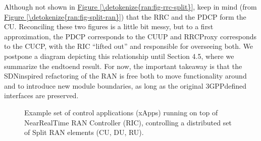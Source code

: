 \documentclass[a4paper,11pt,english]{sphinxmanual}
\let\sphinxpxdimen\pdfpxdimen\else\newdimen\sphinxpxdimen
\begin{document}
\sphinxAtStartPar
Although not shown in \hyperref[\detokenize{ran:fig-rrc-split}]{Figure \ref{\detokenize{ran:fig-rrc-split}}}, keep in
mind (from \hyperref[\detokenize{ran:fig-split-ran}]{Figure \ref{\detokenize{ran:fig-split-ran}}}) that the RRC and the
PDCP form the CU. Reconciling these two figures is a little bit messy, but
to a first approximation, the PDCP corresponds to the CU\sphinxhyphen{}UP and
RRC\sphinxhyphen{}Proxy corresponds to the CU\sphinxhyphen{}CP, with the RIC “lifted out” and
responsible for overseeing both. We postpone a diagram depicting this
relationship until Section 4.5, where we summarize the end\sphinxhyphen{}to\sphinxhyphen{}end
result. For now, the important takeaway is that the SDN\sphinxhyphen{}inspired
refactoring of the RAN is free both to move functionality around and to
introduce new module boundaries, as long as the original 3GPP\sphinxhyphen{}defined
interfaces are preserved.

\begin{figure}[ht]
\centering
\capstart

\noindent\sphinxincludegraphics[width=400\sphinxpxdimen]{{Slide52}.png}
\caption{Example set of control applications (xApps) running on top of
Near\sphinxhyphen{}Real\sphinxhyphen{}Time RAN Controller (RIC), controlling a distributed set
of Split RAN elements (CU, DU, RU).}\label{\detokenize{ran:id10}}\label{\detokenize{ran:fig-ran-controller}}\end{figure}
\end{document}
